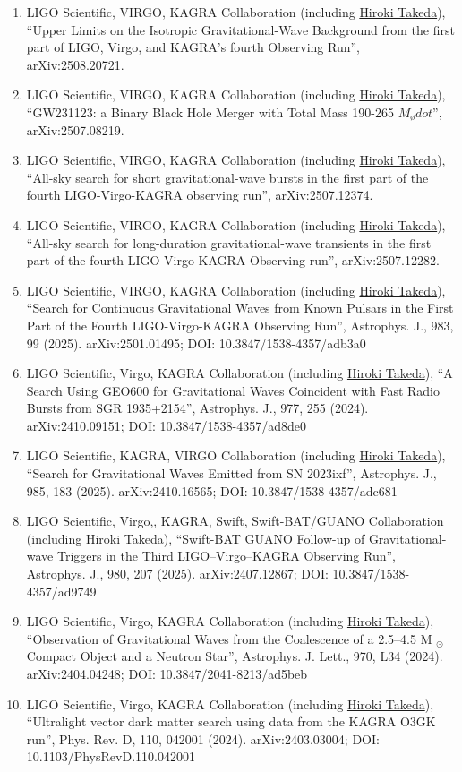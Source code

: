 \documentclass[uplatex, 12pt]{article}
\begin{document}
\begin{enumerate}
\item LIGO Scientific, VIRGO, KAGRA Collaboration (including \uline{Hiroki Takeda}), “Upper Limits on the Isotropic Gravitational-Wave Background from the first part of LIGO, Virgo, and KAGRA's fourth Observing Run”, arXiv:2508.20721.
\item LIGO Scientific, VIRGO, KAGRA Collaboration (including \uline{Hiroki Takeda}), “GW231123: a Binary Black Hole Merger with Total Mass 190-265 $M_ødot$”, arXiv:2507.08219.
\item LIGO Scientific, VIRGO, KAGRA Collaboration (including \uline{Hiroki Takeda}), “All-sky search for short gravitational-wave bursts in the first part of the fourth LIGO-Virgo-KAGRA observing run”, arXiv:2507.12374.
\item LIGO Scientific, VIRGO, KAGRA Collaboration (including \uline{Hiroki Takeda}), “All-sky search for long-duration gravitational-wave transients in the first part of the fourth LIGO-Virgo-KAGRA Observing run”, arXiv:2507.12282.
\item LIGO Scientific, VIRGO, KAGRA Collaboration (including \uline{Hiroki Takeda}), “Search for Continuous Gravitational Waves from Known Pulsars in the First Part of the Fourth LIGO-Virgo-KAGRA Observing Run”, Astrophys. J., 983, 99 (2025). arXiv:2501.01495; DOI: 10.3847/1538-4357/adb3a0
\item LIGO Scientific, Virgo, KAGRA Collaboration (including \uline{Hiroki Takeda}), “A Search Using GEO600 for Gravitational Waves Coincident with Fast Radio Bursts from SGR 1935+2154”, Astrophys. J., 977, 255 (2024). arXiv:2410.09151; DOI: 10.3847/1538-4357/ad8de0
\item LIGO Scientific, KAGRA, VIRGO Collaboration (including \uline{Hiroki Takeda}), “Search for Gravitational Waves Emitted from SN 2023ixf”, Astrophys. J., 985, 183 (2025). arXiv:2410.16565; DOI: 10.3847/1538-4357/adc681
\item LIGO Scientific, Virgo,, KAGRA, Swift, Swift-BAT/GUANO Collaboration (including \uline{Hiroki Takeda}), “Swift-BAT GUANO Follow-up of Gravitational-wave Triggers in the Third LIGO–Virgo–KAGRA Observing Run”, Astrophys. J., 980, 207 (2025). arXiv:2407.12867; DOI: 10.3847/1538-4357/ad9749
\item LIGO Scientific, Virgo, KAGRA Collaboration (including \uline{Hiroki Takeda}), “Observation of Gravitational Waves from the Coalescence of a 2.5–4.5 M $_⊙$ Compact Object and a Neutron Star”, Astrophys. J. Lett., 970, L34 (2024). arXiv:2404.04248; DOI: 10.3847/2041-8213/ad5beb
\item LIGO Scientific, Virgo, KAGRA Collaboration (including \uline{Hiroki Takeda}), “Ultralight vector dark matter search using data from the KAGRA O3GK run”, Phys. Rev. D, 110, 042001 (2024). arXiv:2403.03004; DOI: 10.1103/PhysRevD.110.042001

\end{enumerate}
\end{document}
